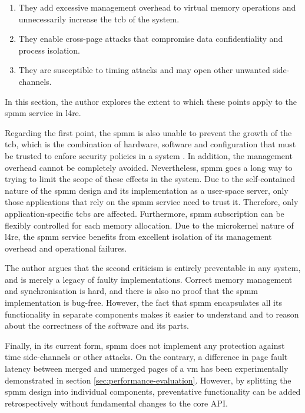\begin{enumerate}
  \item They add excessive management overhead to virtual memory operations and unnecessarily increase the \ac{tcb} of the system.
  \item They enable cross-page attacks that compromise data confidentiality and process isolation.
  \item They are susceptible to timing attacks and may open other unwanted side-channels.
\end{enumerate}

In this section, the author explores the extent to which these points apply to the \ac{spmm} service in \ac{l4re}.

Regarding the first point, the \ac{spmm} is also unable to prevent the growth of the \ac{tcb}, which is the combination of hardware, software and configuration that must be trusted to enfore security policies in a system \cite{tcsec1986}.
In addition, the management overhead cannot be completely avoided.
Nevertheless, \ac{spmm} goes a long way to trying to limit the scope of these effects in the system.
Due to the self-contained nature of the \ac{spmm} design and its implementation as a user-space server, only those applications that rely on the \ac{spmm} service need to trust it.
Therefore, only application-specific \acp{tcb} are affected.
Furthermore, \ac{spmm} subscription can be flexibly controlled for each memory allocation.
Due to the microkernel nature of \ac{l4re}, the \ac{spmm} service benefits from excellent isolation of its management overhead and operational failures.

The author argues that the second criticism is entirely preventable in any system, and is merely a legacy of faulty implementations.
Correct memory management and synchronisation is hard, and there is also no proof that the \ac{spmm} implementation is bug-free.
However, the fact that \ac{spmm} encapsulates all its functionality in separate components makes it easier to understand and to reason about the correctness of the software and its parts.

Finally, in its current form, \ac{spmm} does not implement any protection against time side-channels or other attacks.
On the contrary, a difference in page fault latency between merged and unmerged pages of a \ac{vm} has been experimentally demonstrated in section \ref{sec:performance-evaluation}.
However, by splitting the \ac{spmm} design into individual components, preventative functionality can be added retrospectively without fundamental changes to the core API.
